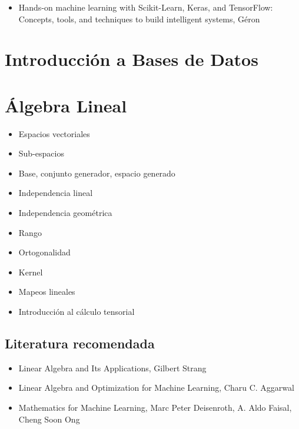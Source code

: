 \documentclass{article}
\begin{document}
            \begin{itemize}
                \item Hands-on machine learning with Scikit-Learn, Keras, and TensorFlow: Concepts, tools, and techniques to build intelligent systems, Géron \cite{geron2019hands}
            \end{itemize}

    \section{Introducción a Bases de Datos}

    \section{Álgebra Lineal}

        \begin{itemize}
            \item Espacios vectoriales
            \item Sub-espacios
            \item Base, conjunto generador, espacio generado
            \item Independencia lineal
            \item Independencia geométrica
            \item Rango
            \item Ortogonalidad
            \item Kernel
            \item Mapeos lineales
            \item Introducción al cálculo tensorial
        \end{itemize}

        \subsection{Literatura recomendada}

            \begin{itemize}
                \item Linear Algebra and Its Applications, Gilbert Strang \cite{strang2006linear}
                \item Linear Algebra and Optimization for Machine Learning, Charu C. Aggarwal \cite{aggarwal2020linear}
                \item Mathematics for Machine Learning, Marc Peter Deisenroth, A. Aldo Faisal, Cheng Soon Ong \cite{deisenroth2020mathematics}
            \end{itemize}
\end{document}
